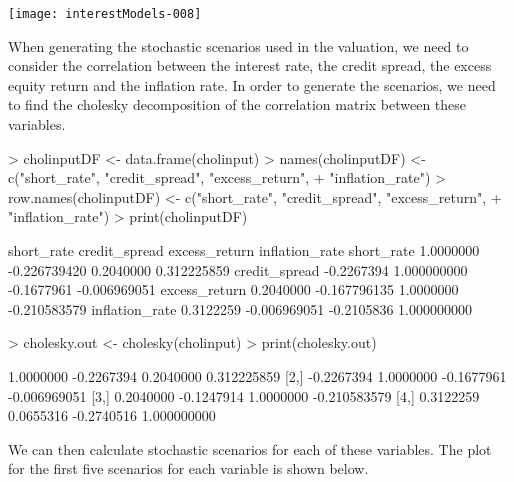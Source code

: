 \documentclass[12pt]{article}
\begin{document}
\texttt{[image: interestModels-008]}

When generating the stochastic scenarios used in the valuation, we need
to consider the correlation between the interest rate, the credit spread,
the excess equity return and the inflation rate. In order to generate
the scenarios, we need to find the cholesky decomposition of the correlation
matrix between these variables.

\begin{Schunk}
\begin{Sinput}
> cholinputDF <- data.frame(cholinput)
> names(cholinputDF) <- c("short_rate", "credit_spread", "excess_return", 
+   "inflation_rate")
> row.names(cholinputDF) <- c("short_rate", "credit_spread", "excess_return",
+   "inflation_rate")
> print(cholinputDF)
\end{Sinput}
\begin{Soutput}
               short_rate credit_spread excess_return inflation_rate
short_rate      1.0000000  -0.226739420     0.2040000    0.312225859
credit_spread  -0.2267394   1.000000000    -0.1677961   -0.006969051
excess_return   0.2040000  -0.167796135     1.0000000   -0.210583579
inflation_rate  0.3122259  -0.006969051    -0.2105836    1.000000000
\end{Soutput}
\begin{Sinput}
> cholesky.out <- cholesky(cholinput)
> print(cholesky.out)
\end{Sinput}
\begin{Soutput}
           [,1]       [,2]       [,3]         [,4]
[1,]  1.0000000 -0.2267394  0.2040000  0.312225859
[2,] -0.2267394  1.0000000 -0.1677961 -0.006969051
[3,]  0.2040000 -0.1247914  1.0000000 -0.210583579
[4,]  0.3122259  0.0655316 -0.2740516  1.000000000
\end{Soutput}
\end{Schunk}

We can then calculate stochastic scenarios for each of these variables. 
The plot for the first five scenarios for each variable is shown below.
\end{document}

